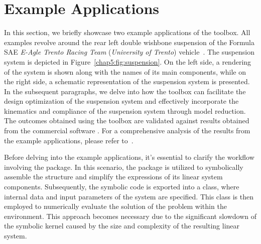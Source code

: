 
\section{Example Applications}
\label{chap5:sec:example_applications}

In this section, we briefly showcase two example applications of the \TrussMe{} toolbox. All examples revolve around the rear left double wishbone suspension of the Formula SAE \emph{E-Agle Trento Racing Team} (\emph{University of Trento}) vehicle~\citep{eagle}. The suspension system is depicted in Figure~\ref{chap5:fig:suspension}. On the left side, a rendering of the system is shown along with the names of its main components, while on the right side, a schematic representation of the suspension system is presented. In the subsequent paragraphs, we delve into how the \TrussMe{} toolbox can facilitate the design optimization of the suspension system and effectively incorporate the kinematics and compliance of the suspension system through model reduction. The outcomes obtained using the \TrussMe{} toolbox are validated against results obtained from the commercial software \Ansys{}. For a comprehensive analysis of the results from the example applications, please refer to~\cite{larcher2024symbolic}.

Before delving into the example applications, it's essential to clarify the workflow involving the \TrussMe{} package. In this scenario, the \TrussMe{} package is utilized to symbolically assemble the structure and simplify the expressions of its linear system components. Subsequently, the symbolic code is exported into a \Matlab{} class, where internal data and input parameters of the system are specified. This \Matlab{} class is then employed to numerically evaluate the solution of the problem within the \Simulink{} environment. This approach becomes necessary due to the significant slowdown of the symbolic kernel caused by the size and complexity of the resulting linear system.

